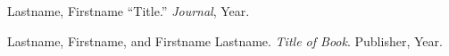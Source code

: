 %
%
\begin{thebibliography}{99}
Lastname, Firstname  ``Title.''  \textit{Journal}, Year.

Lastname, Firstname, and Firstname Lastname.  \textit{Title of Book}.  Publisher, Year.
\end{thebibliography}
